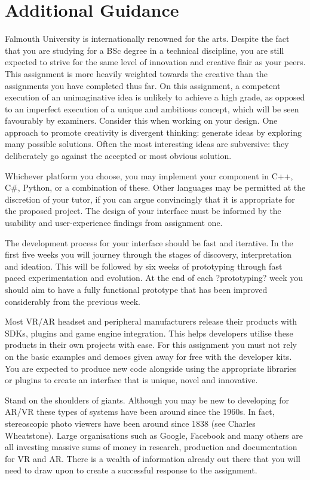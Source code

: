 \documentclass{../../fal_assignment}
\begin{document}
\section*{Additional Guidance}
Falmouth University is internationally renowned for the arts. Despite the fact that you are studying for a BSc degree in a technical discipline, you are still expected to strive for the same level of innovation and creative flair as your peers. This assignment is more heavily weighted towards the creative than the assignments you have completed thus far. On this assignment, a competent execution of an unimaginative idea is unlikely to achieve a high grade, as opposed to an imperfect execution of a unique and ambitious concept, which will be seen favourably by examiners. Consider this when working on your design. One approach to promote creativity is divergent thinking: generate ideas by exploring many possible solutions. Often the most interesting ideas are subversive: they deliberately go against the accepted or most obvious solution.

Whichever platform you choose, you may implement your component in C++, C\#, Python, or a combination of these. Other languages may be permitted at the discretion of your tutor, if you can argue convincingly that it is appropriate for the proposed project. The design of your interface must be informed by the usability and user-experience findings from assignment one. 

The development process for your interface should be fast and iterative. In the first five weeks you will journey through the stages of discovery, interpretation and ideation. This will be followed by six weeks of prototyping through fast paced experimentation and evolution. At the end of each ?prototyping? week you should aim to have a fully functional prototype that has been improved considerably from the previous week. 

Most VR/AR headset and peripheral manufacturers release their products with SDKs, plugins and game engine integration. This helps developers utilise these products in their own projects with ease. For this assignment you must not rely on the basic examples and demoes given away for free with the developer kits.  You are expected to produce new code alongside using the appropriate libraries or plugins to create an interface that is unique, novel and innovative. 

Stand on the shoulders of giants. Although you may be new to developing for AR/VR these types of systems have been around since the 1960s. In fact, stereoscopic photo viewers have been around since 1838 (see Charles Wheatstone). Large organisations such as Google, Facebook and many others are all investing massive sums of money in research, production and documentation for VR and AR. There is a wealth of information already out there that you will need to draw upon to create a successful response to the assignment. 
\end{document}
